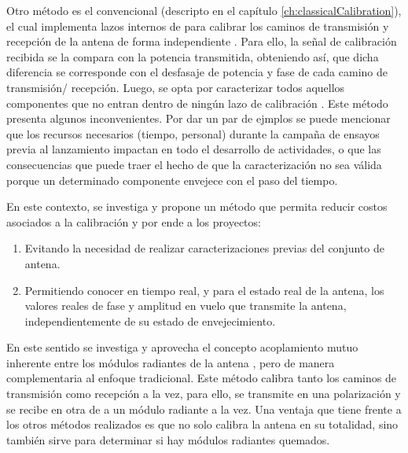 Otro método es el convencional (descripto en el capítulo \ref{ch:classicalCalibration}), el cual implementa lazos internos 
de para calibrar los caminos de transmisión y recepción de la antena de forma independiente \cite{Makhoul2012}
\cite{Luscombe1990}\cite{Seifert1996}\cite{Dall1994}\cite{Freeman1995}\cite{Bibby2003}\cite{Bast2003}\cite{Stove2004}
\cite{Srivastava1996}\cite{Wang2010}. Para ello, la señal de calibración recibida se la compara con la potencia transmitida, 
obteniendo así, que dicha diferencia se corresponde con el desfasaje de potencia y fase de cada camino de transmisión/
recepción. Luego, se opta por caracterizar todos aquellos componentes que no entran dentro de ningún lazo de calibración 
\cite{Freeman1995}. Este método presenta algunos inconvenientes. Por dar un par de ejmplos se puede mencionar que los recursos 
necesarios (tiempo, personal) durante la campaña de ensayos previa al lanzamiento impactan en todo el desarrollo de actividades,
o que las consecuencias que puede traer el hecho de que la caracterización no sea válida porque un determinado componente 
envejece con el paso del tiempo.

En este contexto, se investiga y propone un método que permita reducir costos asociados a la calibración y por ende a los 
proyectos:

\begin{enumerate}
    \item Evitando la necesidad de realizar caracterizaciones previas del conjunto de antena.
    \item Permitiendo conocer en tiempo real, y para el estado real de la antena, los valores reales de fase y amplitud en 
		vuelo que transmite la antena, independientemente de su estado de envejecimiento.
\end{enumerate}

En este sentido se investiga y aprovecha el concepto acoplamiento mutuo inherente entre los módulos radiantes de la antena 
\cite{Aumann1989}, pero de manera complementaria al enfoque tradicional. Este método calibra tanto los caminos de transmisión
como recepción a la vez, para ello, se transmite en una polarización y se recibe en otra de a un módulo radiante a la vez. 
Una ventaja que tiene frente a los otros métodos realizados es que no solo calibra la antena en su totalidad, sino también 
sirve para determinar si hay módulos radiantes quemados.

